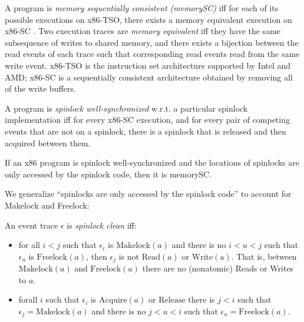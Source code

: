 \begin{definition}[memorySC]
\label{def:memorySC}
  A program is \emph{memory sequentially consistent (memorySC)} iff
  for each of its possible executions on x86-TSO, there exists
  a memory equivalent execution on x86-SC \cite[Definition 4]{owens10:ecoop}.
  Two execution traces are
  \emph{memory equivalent} iff they have the same subsequence of
  writes to shared memory, and there exists a bijection between the
  read events of each trace such that corresponding read events
  read from the same write event.
x86-TSO is the instruction set architecture supported
by Intel and AMD; x86-SC is a sequentially consistent architecture
obtained by removing all of the write buffers.
\end{definition}

\begin{definition}
\label{def:sws}
  A program is \emph{spinlock well-synchronized} w.r.t. a particular
  spinlock implementation iff for every x86-SC execution, and for every
  pair of competing events that are not on a spinlock, there is a
  spinlock that is released and then acquired between them.
  \cite[Definition 7]{owens10:ecoop}
  \end{definition}

\begin{theorem}
\label{thm:owens2}
  If an x86 program is spinlock well-synchronized and the locations
  of spinlocks are only accessed by the spinlock code, then it is
  memorySC. \cite[Theorem 2]{owens10:ecoop}
\end{theorem}

We generalize ``spinlocks are only accessed by the spinlock code''
to account for Makelock and Freelock:
\begin{definition}
\label{def:clean}
An event trace $\epsilon$ is \emph{spinlock clean}
iff: 
\begin{itemize}
  \item for all $i<j$ such that $\epsilon_i$ is
    $\mathrm{Makelock}(a)$
    and there is no $i<u<j$ such that $\epsilon_u$ is 
    $\mathrm{Freelock}(a)$,
    then $\epsilon_j$ is not $\mathrm{Read}(a)$ or $\mathrm{Write(a)}$.
    That is, between $\mathrm{Makelock}(a)$
    and $\mathrm{Freelock}(a)$
    there are no (nonatomic) Reads or Writes to $a$.
  \item forall $i$ such that $\epsilon_i$ is $\mathrm{Acquire}(a)$ or
    $\mathrm{Release}$ there is $j < i$ such that
    $\epsilon_j = \mathrm{Makelock}(a)$ and there is no $j < u < i$
    such that $\epsilon_u = \mathrm{Freelock}(a)$.
  \end{itemize}
\end{definition}

